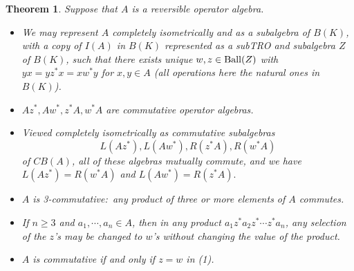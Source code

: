 \documentclass{amsart}
\newtheorem{theorem}{Theorem}[section]
\theoremstyle{remark}
\theoremstyle{definition}
\numberwithin{equation}{section}
\begin{document}
\begin{theorem} \label{both2} Suppose that $A$ is a reversible operator algebra.   
 \begin{itemize} 
\item[(1)]  We may represent 
$A$ completely isometrically and as a subalgebra of $B(K)$, with a copy of 
$I(A)$ in $B(K)$ represented as a subTRO and subalgebra $Z$ of $B(K)$, such that there exists unique $w, z \in {\rm Ball}(Z)$ with
$yx = y z^*x = x w^* y$ for $x, y \in A$ (all operations here the natural ones in $B(K)$).   
\item[(2)]    $Az^*, Aw^*, z^* A, w^* A$ are commutative operator algebras.
\item[(3)]  Viewed completely isometrically as commutative subalgebras $$L(Az^*), L(Aw^*), R(z^* A), R(w^* A)$$
of $CB(A)$, all of these algebras mutually commute, and we have $L(Az^*) = R(w^* A)$ and $L(Aw^*) = R(z^* A).$
\item[(4)]  $A$ is 3-commutative:\ any  product of three or more elements of $A$ commutes.   
\item[(5)]  If $n \geq 3$ and $a_1, \cdots , a_n \in A$, then in any  product 
$a_1 z^* a_2 z^* \cdots z^* a_n$,  any selection of the $z$'s may be changed to $w$'s without changing the 
value of the product.
\item[(6)]  $A$ is commutative if and only if $z = w$ in {\rm (1)}. 
 \end{itemize} 
\end{theorem}
\end{document}
